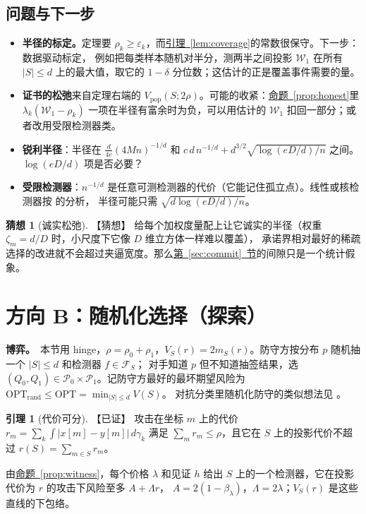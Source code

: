 \documentclass[11pt,a4paper,fontset=none]{ctexart}
\newcommand{\Secref}[1]{\hyperref[#1]{第~\ref*{#1}~节}}
\newcommand{\Nref}[2]{\hyperref[#2]{#1~\ref*{#2}}}
\newcommand{\Vp}{V_{\mathrm{pop}}}
\theoremstyle{definition}
\newtheorem{lemma}[proposition]{引理}
\newtheorem{conjecture}[proposition]{猜想}
\newcommand{\para}[1]{\par\smallskip\noindent\textbf{#1}\ }
\newcommand{\status}[1]{\textrm{【#1】}}
\begin{document}
\subsection{问题与下一步}
\begin{itemize}
\item \textbf{半径的标定。}定理要 $\rho_k\ge\varepsilon_k$，而\Nref{引理}{lem:coverage}的常数很保守。下一步：数据驱动标定，
例如把每类样本随机对半分，测两半之间投影 $\mathcal W_1$ 在所有 $|S|\le d$ 上的最大值，取它的 $1-\delta$ 分位数；这估计的正是覆盖事件需要的量。
\item \textbf{证书的松弛}来自定理右端的 $\Vp(S;2\rho)$。可能的收紧：\Nref{命题}{prop:honest}里
$\lambda_k(\mathcal W_1-\rho_k)$ 一项在半径有富余时为负，可以用估计的 $\mathcal W_1$ 扣回一部分；或者改用受限检测器类。
\item \textbf{锐利半径}：半径在 $\frac d{4e}(4Mn)^{-1/d}$ 和 $c\,d\,n^{-1/d}+d^{3/2}\sqrt{\log(eD/d)/n}$ 之间。$\log(eD/d)$ 项是否必要？
\item \textbf{受限检测器}：$n^{-1/d}$ 是任意可测检测器的代价（它能记住孤立点）。线性或核检测器按 \cite{gao2023finite} 的分析，
半径可能只需 $\sqrt{d\log(eD/d)/n}$。
\end{itemize}

\begin{conjecture}[诚实松弛]\label{conj:relax}\status{猜想}
给每个加权度量配上让它诚实的半径（权重 $\zeta_m=d/D$ 时，小尺度下它像 $D$ 维立方体一样难以覆盖），
承诺界相对最好的稀疏选择的改进就不会超过夹逼宽度。那么\Secref{sec:commit}的间隙只是一个统计假象。
\end{conjecture}

\section{方向 B：随机化选择（探索）}\label{sec:random}
\para{博弈。}本节用 hinge，$\rho=\rho_0+\rho_1$，$V_S(r)=2m_S(r)$。防守方按分布 $p$ 随机抽一个 $|S|\le d$ 和检测器 $f\in\mathcal F_S$；
对手知道 $p$ 但不知道抽签结果，选 $(Q_0,Q_1)\in\mathcal P_0\times\mathcal P_1$。记防守方最好的最坏期望风险为 $\mathrm{OPT}_{\mathrm{rand}}\le\mathrm{OPT}=\min_{|S|\le d}V(S)$。
对抗分类里随机化防守的类似想法见 \cite{pinot2020randomization,meunier2021mixed,globerson2006nightmare}。

\begin{lemma}[代价可分]\label{lem:split}\status{已证}
攻击在坐标 $m$ 上的代价 $r_m=\sum_k\int|x[m]-y[m]|\,d\gamma_k$ 满足 $\sum_mr_m\le\rho$，且它在 $S$ 上的投影代价不超过 $r(S)=\sum_{m\in S}r_m$。
\end{lemma}
由\Nref{命题}{prop:witness}，每个价格 $\lambda$ 和见证 $h$ 给出 $S$ 上的一个检测器，它在投影代价为 $r$ 的攻击下风险至多 $A+\Lambda r$，
$A=2(1-\beta_\lambda)$，$\Lambda=2\lambda$；$V_S(r)$ 是这些直线的下包络。
\end{document}
